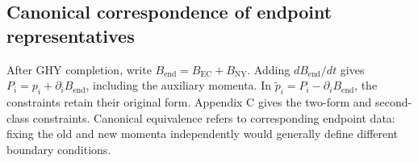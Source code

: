 \subsection{Canonical correspondence of endpoint representatives}

After GHY completion, write $B_{\mathrm{end}}=B_{\mathrm{EC}}+B_{\mathrm{NY}}$. Adding $dB_{\mathrm{end}}/dt$ gives $P_i=p_i+\partial_iB_{\mathrm{end}}$, including the auxiliary momenta. In $\widetilde p_i=P_i-\partial_iB_{\mathrm{end}}$, the constraints retain their original form. Appendix C gives the two-form and second-class constraints. Canonical equivalence refers to corresponding endpoint data: fixing the old and new momenta independently would generally define different boundary conditions.
